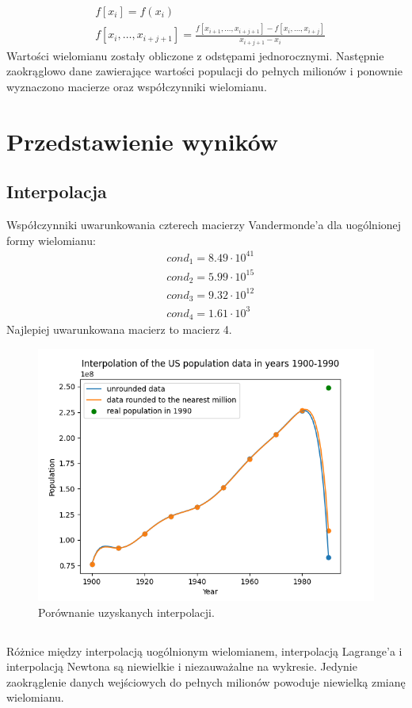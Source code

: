\documentclass[11pt]{scrartcl}
\begin{document}
    \begin{align*}
        & f[x_i] = f(x_i) \\
        & f[x_i, \ldots ,x_{i+j+1}] =
        \frac{f[x_{i+1}, \ldots ,x_{i+j+1}]-f[x_i, \ldots ,x_{i+j}]}{x_{i+j+1}-x_i}
    \end{align*}
    Wartości wielomianu zostały obliczone z odstępami jednorocznymi. Następnie
    zaokrąglowo dane zawierające wartości populacji do pełnych milionów
    i ponownie wyznaczono macierze oraz współczynniki wielomianu.

    \section{Przedstawienie wyników}
    \subsection{Interpolacja}
    Współczynniki uwarunkowania czterech macierzy Vandermonde'a dla uogólnionej formy
    wielomianu:
    \begin{align*}
        & cond_1 = 8.49 \cdot 10^{41} \\
        & cond_2 = 5.99 \cdot 10^{15} \\
        & cond_3 = 9.32 \cdot 10^{12} \\
        & cond_4 = 1.61 \cdot 10^3
    \end{align*}
    Najlepiej uwarunkowana macierz to macierz 4.

    \begin{figure}[H]
        \centering
        \includegraphics[width=0.8\linewidth]{interpolation.png}
        \caption{Porównanie uzyskanych interpolacji.}
    \end{figure}

    \subsection*{}
    Różnice między interpolacją uogólnionym wielomianem, interpolacją Lagrange'a
    i interpolacją Newtona są niewielkie i niezauważalne na wykresie. Jedynie
    zaokrąglenie danych wejściowych do pełnych milionów powoduje niewielką zmianę
    wielomianu.
\end{document}
